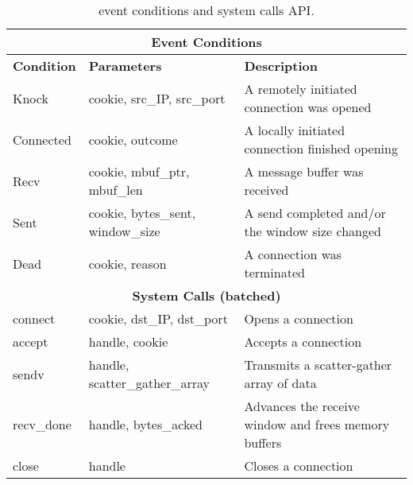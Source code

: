 \begin{table*}[t]
\centering
\begin{small}
\begin{tabular}{|l|l|l|}
\hline
\multicolumn{3}{|c|}{{\bf Event Conditions}} \\
\hline
{\bf Condition} &           {\bf Parameters}  &
{\bf Description}\\
\hline
Knock  &               cookie, src\_IP, src\_port		& A remotely initiated connection was opened \\
Connected &            cookie, outcome				& A locally initiated connection finished opening \\
Recv &                 cookie, mbuf\_ptr, mbuf\_len		& A message buffer was received \\
Sent &                 cookie, bytes\_sent, window\_size	& A send completed and/or the window size changed \\
Dead &                 cookie, reason				& A connection was terminated \\
\hline
\hline
\multicolumn{3}{|c|}{{\bf System Calls (batched)}} \\
\hline
connect &             cookie, dst\_IP, dst\_port		& Opens a connection\\
accept &              handle, cookie				& Accepts a connection\\
sendv &               handle, scatter\_gather\_array		& Transmits a scatter-gather array of data\\
recv\_done &          handle, bytes\_acked			& Advances the receive window and frees memory buffers\\
close &               handle					& Closes a connection\\
\hline
\end{tabular}
\caption{\ix event conditions and system calls API.}
\label{tbl:api}
\end{small}
\end{table*}

